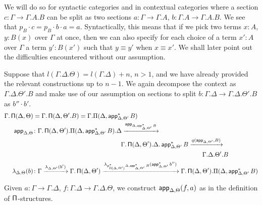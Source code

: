 We will do so for syntactic categories and in contextual categories where a
section $c\colon\Gamma\rightarrow\Gamma.A.B$ can be split as
two sections $a\colon\Gamma\rightarrow\Gamma.A$,
$b\colon\Gamma.A\rightarrow\Gamma.A.B$.
We see that $p_B\cdot c=p_B\cdot b\cdot a=a$. Syntactically, this means that if
we pick two terms $x:A$, $y:B(x)$ over $\Gamma$ at once, then we can also
specify for each choice of a term $x':A$ over $\Gamma$ a term $y':B(x')$ such
that $y\equiv y'$ when $x\equiv x'$. We shall later point out the
difficulties encountered without our assumption.

\begin{construction}[Part 2]
  Suppose that
  $l(\Gamma.\Delta.\Theta)=l(\Gamma.\Delta)+n$, $n>1$, and we have already
  provided the relevant constructions up to $n-1$. We again decompose
  the context as $\Gamma.\Delta.\Theta'.B$ and make use of our assumption on
  sections to split $b\colon\Gamma.\Delta\rightarrow\Gamma.\Delta.\Theta'.B$ as
  $b''\cdot b'$.
  \begin{align*}
    \Gamma.\operatorname{\mathsf{\Pi}}(\Delta,\Theta)
    &=\Gamma.\operatorname{\mathsf{\Pi}}(\Delta,\Theta'.B)=\Gamma.\Pi(\Delta,\operatorname{\mathsf{app}}^*_{\Delta,\Theta'}B) \\
    \operatorname{\mathsf{app}}_{\Delta,\Theta}
    &\colon\Gamma.\operatorname{\mathsf{\Pi}}(\Delta,\Theta').\Pi(\Delta,\operatorname{\mathsf{app}}^*_{\Delta,\Theta'}B).\Delta
    \xrightarrow{\operatorname{\mathsf{app}}_{\Delta,\operatorname{\mathsf{app}}^*_{\Delta,\Theta'}B}} \\
    &\quad\quad\quad\quad\quad\quad\quad\quad\quad\quad\quad\quad\quad\quad
    \Gamma.\operatorname{\mathsf{\Pi}}(\Delta,\Theta').\Delta.\operatorname{\mathsf{app}}^*_{\Delta,\Theta'}B
    \xrightarrow{q(\operatorname{\mathsf{app}}_{\Delta,\Theta'},B)} \\
    &\quad\quad\quad\quad\quad\quad\quad\quad\quad\quad\quad\quad\quad\quad\quad\quad\quad\quad\quad\quad\quad\quad\quad\quad\quad\quad\quad
    \Gamma.\Delta.\Theta'.B \\
    \lambda_{\Delta,\Theta}(b)
    &\colon\Gamma
    \xrightarrow{\lambda_{\Delta,\Theta'}(b')}
    \Gamma.\operatorname{\mathsf{\Pi}}(\Delta,\Theta')
    \xrightarrow{\lambda_{p^*_{\operatorname{\mathsf{\Pi}}(\Delta,\Theta')}\Delta,\operatorname{\mathsf{app}}^*_{\Delta,\Theta'}B}(\operatorname{\mathsf{app}}_{\Delta,\Theta'}^*b'')}
    \Gamma.\operatorname{\mathsf{\Pi}}(\Delta,\Theta').\Pi(\Delta,\operatorname{\mathsf{app}}^*_{\Delta,\Theta'}B)
  \end{align*}

\end{construction}

Given $a\colon\Gamma\rightarrow\Gamma.\Delta$,
$f\colon\Gamma.\Delta\rightarrow\Gamma.\Delta.\Theta$, we construct
$\operatorname{\mathsf{app}}_{\Delta,\Theta}(f,a)$ as in the definition of $\operatorname{\mathsf{\Pi}}$-structures.

